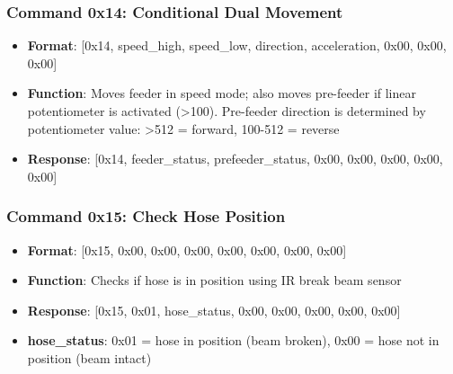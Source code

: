 \documentclass[11pt,a4paper]{article}
\begin{document}
\subsubsection{Command 0x14: Conditional Dual Movement}
\begin{itemize}
    \item \textbf{Format}: [0x14, speed\_high, speed\_low, direction, acceleration, 0x00, 0x00, 0x00]
    \item \textbf{Function}: Moves feeder in speed mode; also moves pre-feeder if linear potentiometer is activated (>100). Pre-feeder direction is determined by potentiometer value: >512 = forward, 100-512 = reverse
    \item \textbf{Response}: [0x14, feeder\_status, prefeeder\_status, 0x00, 0x00, 0x00, 0x00, 0x00]
\end{itemize}

\subsubsection{Command 0x15: Check Hose Position}
\begin{itemize}
    \item \textbf{Format}: [0x15, 0x00, 0x00, 0x00, 0x00, 0x00, 0x00, 0x00]
    \item \textbf{Function}: Checks if hose is in position using IR break beam sensor
    \item \textbf{Response}: [0x15, 0x01, hose\_status, 0x00, 0x00, 0x00, 0x00, 0x00]
    \item \textbf{hose\_status}: 0x01 = hose in position (beam broken), 0x00 = hose not in position (beam intact)
\end{itemize}
\end{document}
